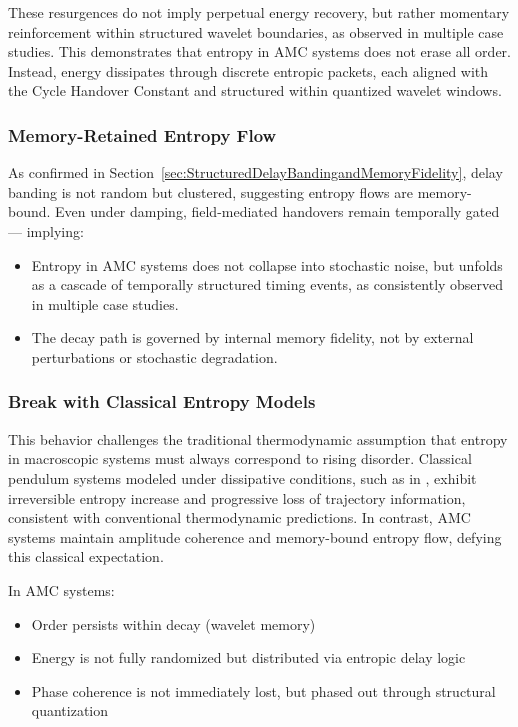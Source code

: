 \documentclass[10pt,aps,pre,onecolumn,superscriptaddress,notitlepage]{revtex4-2}
\begin{document}
These resurgences do not imply perpetual energy recovery, but rather momentary reinforcement within structured wavelet boundaries, as observed in multiple case studies. This demonstrates that entropy in AMC systems does not erase all order. Instead, energy dissipates through discrete entropic packets, each aligned with the Cycle Handover Constant and structured within quantized wavelet windows.

\subsubsection{Memory-Retained Entropy Flow}
As confirmed in Section~\ref{sec:StructuredDelayBandingandMemoryFidelity}, delay banding is not random but clustered, suggesting entropy flows are memory-bound. Even under damping, field-mediated handovers remain temporally gated — implying:
\begin{itemize}
    \item Entropy in AMC systems does not collapse into stochastic noise, but unfolds as a cascade of temporally structured timing events, as consistently observed in multiple case studies.
    \item The decay path is governed by internal memory fidelity, not by external perturbations or stochastic degradation.
\end{itemize}

\subsubsection{Break with Classical Entropy Models}
This behavior challenges the traditional thermodynamic assumption that entropy in macroscopic systems must always correspond to rising disorder. 
Classical pendulum systems modeled under dissipative conditions, such as in \cite{mahapatra2024entropy}, exhibit irreversible entropy increase and progressive loss of trajectory information, consistent with conventional thermodynamic predictions. In contrast, AMC systems maintain amplitude coherence and memory-bound entropy flow, defying this classical expectation.

In AMC systems:

\begin{itemize}
    \item Order persists within decay (wavelet memory)
    \item Energy is not fully randomized but distributed via entropic delay logic
    \item Phase coherence is not immediately lost, but phased out through structural quantization
\end{itemize}
\end{document}
